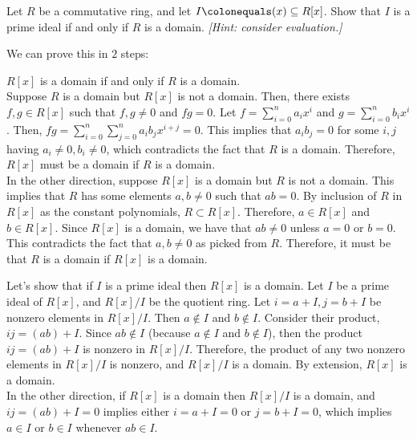 \begin{problem}
  Let $R$ be a commutative ring, and let $I \colonequals (x) \subseteq R[x]$.
  Show that $I$ is a prime ideal if and only if $R$ is a domain.
  \emph{[Hint: consider evaluation.]}
\end{problem}

\begin{Answer}
  We can prove this in $2$ steps:
  \begin{enumalph}
    \item $R[x]$ is a domain if and only if $R$ is a domain. \\
      Suppose $R$ is a domain but $R[x]$ is not a domain.
      Then, there exists $f, g \in R[x]$ such that $f, g \neq 0$ and $fg = 0$.
      Let $f = \sum_{i=0}^n a_i x^i$ and $g = \sum_{i=0}^n b_i x^i$.
      Then, $fg = \sum_{i=0}^n \sum_{j=0}^n a_ib_j x^{i+j} = 0$.
      This implies that $a_ib_j = 0$ for some $i, j$ having $a_i \ne 0, b_i \ne 0$,
      which contradicts the fact that $R$ is a domain. Therefore, $R[x]$ must be a domain
      if $R$ is a domain. \\
      In the other direction, suppose $R[x]$ is a domain but $R$ is not a domain.
      This implies that $R$ has some elements $a, b \ne 0$ such that $ab = 0$.
      By inclusion of $R$ in $R[x]$ as the constant polynomials,
      $R \subset R[x]$. Therefore, $a \in R[x]$ and $b \in R[x]$.
      Since $R[x]$ is a domain, we have that $ab \ne 0$ unless $a = 0$ or $b = 0$.
      This contradicts the fact that $a, b \ne 0$ as picked from $R$.
      Therefore, it must be that $R$ is a domain if $R[x]$ is a domain.
    \item Let's show that if $I$ is a prime ideal then $R[x]$ is a domain.
      Let $I$ be a prime ideal of $R[x]$,
      and $R[x]/I$ be the quotient ring.
      Let $i = a + I, j = b + I$ be nonzero elements in $R[x]/I$.
      Then $a \notin I$ and $b \notin I$.
      Consider their product, $ij = (ab) + I$.
      Since $ab \notin I$ (because $a \notin I$ and $b \notin I$),
      then the product $ij = (ab) + I$ is nonzero in $R[x]/I$.
      Therefore, the product of any two nonzero elements in $R[x]/I$ is nonzero,
      and $R[x]/I$ is a domain. By extension, $R[x]$ is a domain. \\
      In the other direction,
      if $R[x]$ is a domain then $R[x]/I$ is a domain, and $ij = (ab) + I = 0$
      implies either $i = a + I = 0$ or $j = b + I = 0$, which implies
      $a \in I$ or $b \in I$ whenever $ab \in I$.
  \end{enumalph}
\end{Answer}
